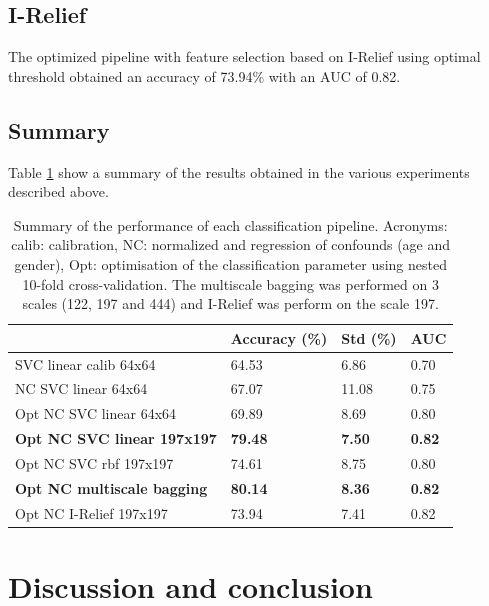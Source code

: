 \documentclass[12pt,journal,compsoc]{IEEEtran}
\begin{document}
\subsection{I-Relief}

The optimized pipeline with feature selection based on I-Relief using optimal threshold obtained an accuracy of 73.94\% with an AUC of 0.82.

\subsection{Summary}
Table \ref{tab_results} show a summary of the results obtained in the various experiments described above.

\begin{table}[h]
\begin{tabular}{llll}
\hline
                                   & Accuracy (\%)  & Std (\%)      & AUC           \\ \hline
SVC linear calib 64x64             & 64.53          & 6.86          & 0.70          \\
NC SVC linear 64x64                & 67.07          & 11.08         & 0.75          \\
Opt NC SVC linear 64x64            & 69.89          & 8.69          & 0.80          \\
\textbf{Opt NC SVC linear 197x197} & \textbf{79.48} & \textbf{7.50} & \textbf{0.82} \\
Opt NC SVC rbf 197x197             & 74.61          & 8.75          & 0.80          \\
\textbf{Opt NC multiscale bagging}& \textbf{80.14} & \textbf{8.36} & \textbf{0.82} \\
Opt NC I-Relief 197x197            & 73.94          & 7.41          & 0.82          \\ \hline
\end{tabular}
\label{tab_results}
\caption{Summary of the performance of each classification pipeline. Acronyms: calib: calibration, NC: normalized and regression of confounds (age and gender), Opt: optimisation of the classification parameter using nested 10-fold cross-validation. The multiscale bagging was performed on 3 scales (122, 197 and 444) and I-Relief was perform on the scale 197. }
\end{table}

\section{Discussion and conclusion}
\end{document}
